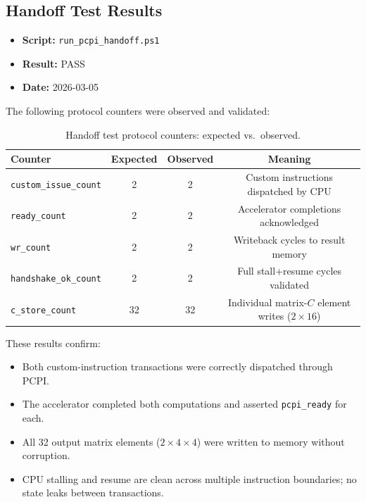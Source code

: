 ﻿\documentclass[12pt,a4paper]{report}
\renewcommand{\arraystretch}{1.2}
\begin{document}
\subsection{Handoff Test Results}

\begin{itemize}
    \item \textbf{Script:} \texttt{run\_pcpi\_handoff.ps1}
    \item \textbf{Result:} PASS
    \item \textbf{Date:} 2026-03-05
\end{itemize}

The following protocol counters were observed and validated:

\begin{table}[H]
\centering
\small
\setlength{\tabcolsep}{10pt}
\renewcommand{\arraystretch}{1.3}
\begin{tabular}{lccc}
\toprule
\textbf{Counter} & \textbf{Expected} & \textbf{Observed} & \textbf{Meaning} \\
\midrule
\texttt{custom\_issue\_count}    & 2  & 2  & Custom instructions dispatched by CPU \\
\texttt{ready\_count}           & 2  & 2  & Accelerator completions acknowledged \\
\texttt{wr\_count}              & 2  & 2  & Writeback cycles to result memory \\
\texttt{handshake\_ok\_count}   & 2  & 2  & Full stall+resume cycles validated \\
\texttt{c\_store\_count}        & 32 & 32 & Individual matrix-$C$ element writes ($2 \times 16$) \\
\bottomrule
\end{tabular}
\caption{Handoff test protocol counters: expected vs.\ observed.}
\label{tab:handoff_counters}
\end{table}

These results confirm:

\begin{itemize}
    \item Both custom-instruction transactions were correctly dispatched through PCPI.
    \item The accelerator completed both computations and asserted \texttt{pcpi\_ready} for each.
    \item All 32 output matrix elements ($2 \times 4 \times 4$) were written to memory without corruption.
    \item CPU stalling and resume are clean across multiple instruction boundaries; no state leaks between transactions.
\end{itemize}
\end{document}
